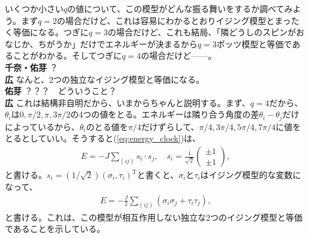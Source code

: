 \documentclass[paper=b5j,fontsize=12Q,jafontsize=12Q,baselineskip=21Q]{jlreq}
\DeclareRobustCommand{\hiron}{\textbf{広 }}
\DeclareRobustCommand{\umen}{\textbf{佑芽 }}
\begin{document}
\begin{refsection}

いくつか小さい$q$の値について、この模型がどんな振る舞いをするか調べてみよう。まず$q=2$の場合だけど、これは容易にわかるとおりイジング模型とまったく等価になる。つぎに$q=3$の場合だけど、これも結局、「隣どうしのスピンがおなじか、ちがうか」だけでエネルギーが決まるから$q=3$ポッツ模型と等価であることがわかる。そしてつぎに$q=4$の場合だけど------。
\\\textbf{千奈・佑芽 } ？
\\\hiron なんと、2つの独立なイジング模型と等価になる。
\\\umen ？？？　どういうこと？
\\\hiron これは結構非自明だから、いまからちゃんと説明する。まず、$q=4$だから、$\theta_i$は$0,\pi/2,\pi,3\pi/2$の4つの値をとる。エネルギーは隣り合う角度の差$\theta_i-\theta_j$だけによっているから、$\theta_i$のとる値を$\pi/4$だけずらして、$\pi/4,3\pi/4,5\pi/4,7\pi/4$に値をとるとしていい。そうすると(\ref{eq:energy_clock})は、
\begin{align}
  E=-J\sum_{(ij)}s_i\cdot s_j,\quad s_i=\frac1{\sqrt2}
  \begin{pmatrix}
    \pm1 \\ \pm1
  \end{pmatrix},
\end{align}
と書ける。$s_i=(1/\sqrt 2)(\sigma_i,\tau_i)^{\mathrm T}$と書くと、$\sigma_i$と$\tau_i$はイジング模型的な変数になって、
\begin{align}
  E=-\frac J2\sum_{(ij)}(\sigma_i\sigma_j+\tau_i\tau_j),
\end{align}
と書ける。これは、この模型が相互作用しない独立な2つのイジング模型と等価であることを示している。


\end{refsection}
\end{document}
